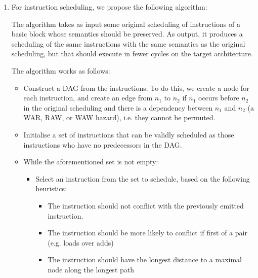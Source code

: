 


\begin{enumerate}[label=(\alph*)]

  \item

    For instruction scheduling, we propose the following algorithm:

    The algorithm takes as input some original scheduling of instructions of a basic block whose semantics should be preserved. As output, it produces a scheduling of the same instructions with the same semantics as the original scheduling, but that should execute in fewer cycles on the target architecture.

    The algorithm works as follows:

    \begin{itemize}
        \item
          Construct a DAG from the instructions. To do this, we create a node for each instruction, and create an edge from $n_1$ to $n_2$ if $n_1$ occurs before $n_2$ in the original scheduling and there is a dependency between $n_1$ and $n_2$ (a WAR, RAW, or WAW hazard), i.e. they cannot be permuted.

          \item
            Initialise a set of instructions that can be validly scheduled as those instructions who have no predecessors in the DAG.

            \item
              While the aforementioned set is not empty:

              \begin{itemize}
                  \item
                    Select an instruction from the set to schedule, based on the following heuristics:

                    \begin{itemize}
                        \item
                          The instruction should not conflict with the previously emitted instruction.

                          \item
                            The instruction should be more likely to conflict if first of a pair (e.g. loads over adds)

                            \item
                              The instruction should have the longest distance to a maximal node along the longest path
                    \end{itemize}


\end{itemize}
\end{itemize}
\end{enumerate}
